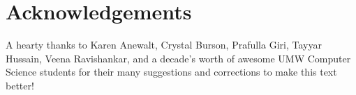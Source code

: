  
\chapter{Acknowledgements}

A hearty thanks to Karen Anewalt, Crystal Burson, Prafulla Giri, Tayyar
Hussain, Veena Ravishankar, and a decade's worth of awesome UMW Computer
Science students for their many suggestions and corrections to make this text
better!
